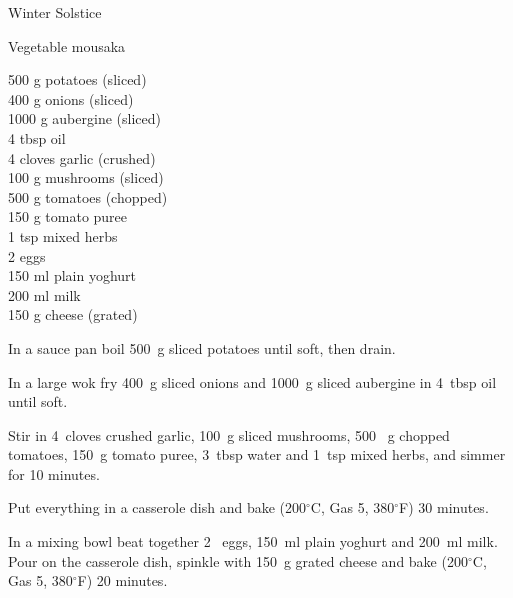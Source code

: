 \begin{menu}{Winter Solstice}
    \begin{recipe}{2}{Vegetable mousaka}%
    
		\begin{ingredients}
		500 g potatoes (sliced) \\
	400 g onions (sliced) \\
	1000 g aubergine (sliced) \\
	4 tbsp oil  \\
	4 cloves garlic (crushed) \\
	100 g mushrooms (sliced) \\
	500  g tomatoes (chopped) \\
	150 g tomato puree  \\
	1 tsp mixed herbs  \\
	2  eggs  \\
	150 ml plain yoghurt  \\
	200 ml milk  \\
	150 g cheese (grated) \\
	
		\end{ingredients}
	
    \begin{instructions}
    \item 
        In a sauce pan boil
        500~g sliced potatoes
        until soft,
        then drain.
      \item 
        In a large wok fry
        400~g sliced onions
        and
        1000~g sliced aubergine
        in
        4~tbsp  oil
        until soft.
      \item 
        Stir in
        4~cloves crushed garlic,
        100~g sliced mushrooms,
        500 ~g chopped tomatoes,
        150~g  tomato puree,
        3~tbsp  water
        and
        1~tsp  mixed herbs,
        and simmer for 10 minutes.
      \item 
        Put everything in a casserole dish
        and bake 
      (200$^{\circ}$C, Gas 5, 380$^{\circ}$F)
     30 minutes.
      \item 
        In a mixing bowl beat together
        2~  eggs,
        150~ml  plain yoghurt
        and
        200~ml  milk.
        Pour on the casserole dish, spinkle with
        150~g grated cheese
        and bake 
      (200$^{\circ}$C, Gas 5, 380$^{\circ}$F)
     20 minutes.
      
    \end{instructions}
    \end{recipe}%
  

\end{menu}
